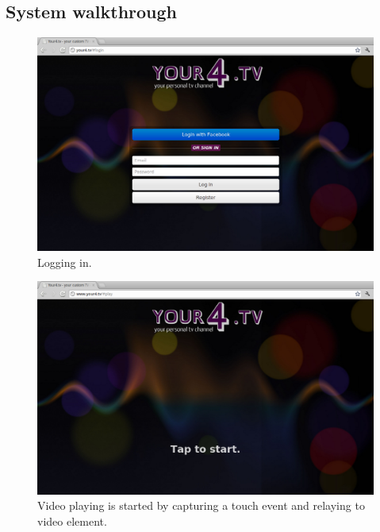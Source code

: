 \subsection{System walkthrough}
\begin{figure}[th]
	\centering
	\includegraphics[width=\textwidth,height=0.5\textheight,keepaspectratio]{images/screenshots/your4-login.png}
	\caption{Logging in.}
	\label{fig:your4-login}
\end{figure}
\begin{figure}[th]
	\centering
	\includegraphics[width=\textwidth,height=0.5\textheight,keepaspectratio]{images/screenshots/your4-tap-to-start.png}
	\caption{Video playing is started by capturing a touch event and relaying to video element.}
	\label{fig:your4-tap-to-start}
\end{figure}

